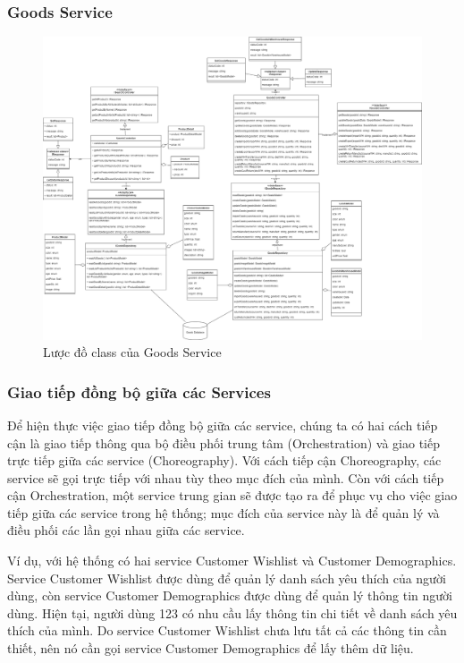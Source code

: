 \subsubsection{Goods Service}
\begin{figure}[!htp]
	\centering
	\includegraphics[width=17cm]{img/Architecture/service/GoodsService.png}
	\newline
	\caption{Lược đồ class của Goods Service}
\end{figure}


\newpage
\subsubsection{Giao tiếp đồng bộ giữa các Services}

\par Để hiện thực việc giao tiếp đồng bộ giữa các service, chúng ta có hai cách tiếp cận là giao tiếp thông qua bộ điều phối trung tâm (Orchestration) và giao tiếp trực tiếp giữa các service (Choreography). Với cách tiếp cận Choreography, các service sẽ gọi trực tiếp với nhau tùy theo mục đích của mình. Còn với cách tiếp cận Orchestration, một service trung gian sẽ được tạo ra để phục vụ cho việc giao tiếp giữa các service trong hệ thống; mục đích của service này là để quản lý và điều phối các lần gọi nhau giữa các service. 
\par Ví dụ, với hệ thống có hai service Customer Wishlist và Customer Demographics. Service Customer Wishlist được dùng để quản lý danh sách yêu thích của người dùng, còn service Customer Demographics được dùng để quản lý thông tin người dùng. Hiện tại, người dùng 123 có nhu cầu lấy thông tin chi tiết về danh sách yêu thích của mình. Do service Customer Wishlist chưa lưu tất cả các thông tin cần thiết, nên nó cần gọi service Customer Demographics để lấy thêm dữ liệu.

